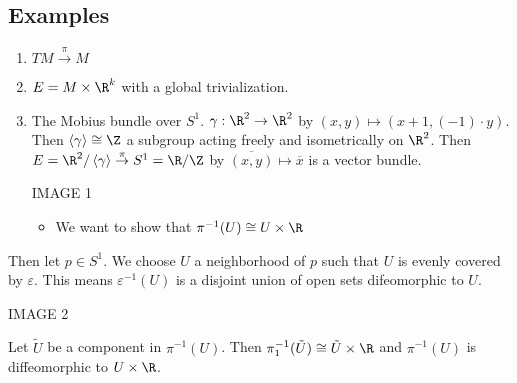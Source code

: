 \documentclass[11pt]{article}
\begin{document}
\subsection*{Examples}
\label{sec:org4c480d5}
\begin{enumerate}
\item \(TM\overset{\pi}{\to}M\)\\
\item \(E=M\times\R^{k}\) with a global trivialization.\\
\item The Mobius bundle over \(S^{1}\). \(\gamma:\R^{2}\to\R^{2}\) by \((x,y)\mapsto(x+1,(-1)\cdot y)\). Then \(\left\langle \gamma \right\rangle\cong\Z\) a subgroup acting freely and isometrically on \(\R^{2}\). Then \(E=\R^{2}/\left\langle \gamma \right\rangle\overset{\pi}{\to}S^{1}=\R/\Z\) by \(\overline{(x,y)}\mapsto\overline{x}\) is a vector bundle.\\
\begin{center}
IMAGE 1\\
\end{center}
\begin{itemize}
\item We want to show that \(\pi^{-1}(U)\cong U\times\R\)\\

\end{itemize}
\end{enumerate}

Then let \(p\in S^{1}\). We choose \(U\) a neighborhood of \(p\) such that \(U\) is evenly covered by \(\varepsilon\). This means \(\varepsilon^{-1}(U)\) is a disjoint union of open sets difeomorphic to \(U\).\\
\begin{center}
IMAGE 2\\
\end{center}
Let \(\tilde{U}\) be a component in \(\pi^{-1}(U)\). Then \(\pi_{1}^{-1}(\tilde{U})\cong\tilde{U}\times\R\) and \(\pi^{-1}(U)\) is diffeomorphic to \(U\times\R\).\\
\end{document}
